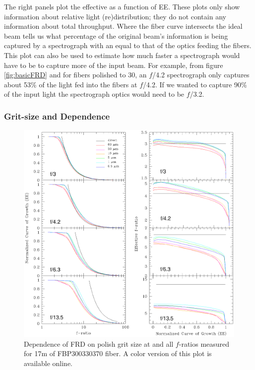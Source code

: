 The right panels plot the effective \fratio as a function of
EE. These plots only show information about relative light
(re)distribution; they do not contain any information about total
throughput.  Where the fiber curve intersects the ideal beam tells us
what percentage of the original beam's information is being captured
by a spectrograph with an \fratio equal to that of the optics feeding
the fibers. This plot can also be used to estimate how much faster a
spectrograph would have to be to capture more of the input beam. For
example, from figure \ref{fig:basicFRD} and for fibers polished to 30\mum, an $f$/4.2
spectrograph only captures about 53\% of the light fed into the fibers 
at $f$/4.2. If we wanted to capture 90\% of the input light the
spectrograph optics would need to be $f$/3.2.

\subsubsection{Grit-size and \fratio Dependence}
\label{sec:gritwave}
\begin{figure}[htp]
  \centering
  \includegraphics[width=\textwidth]{FRD/figs/gritplot.eps}
  \caption{\label{fig:grit}Dependence of FRD on polish grit size at
    \filty and all $f$-ratios measured for 17m of FBP300330370 fiber. A color version of this plot is available online.}
\end{figure}

